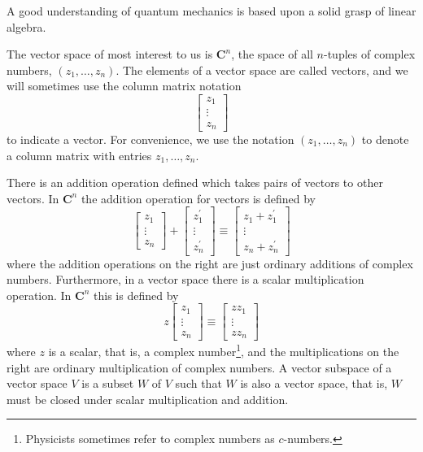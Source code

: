 A good understanding of quantum mechanics is based upon a solid grasp of linear algebra.

The vector space of most interest to us is $\mathbf{C}^{n}$, the space of all $n$-tuples of complex numbers, $\left(z_{1}, \ldots, z_{n}\right)$. The elements of a vector space are called vectors, and we will sometimes use the column matrix notation
\begin{equation}
    \left[\begin{array}{c}
z_{1} \\
\vdots \\
z_{n}
\end{array}\right]
\end{equation}
to indicate a vector. For convenience, we use the notation $\left(z_{1}, \ldots, z_{n}\right)$ to denote a column matrix with entries $z_{1}, \ldots, z_{n}$. 

There is an addition operation defined which takes pairs of vectors to other vectors. In $\mathbf{C}^{n}$ the addition operation for vectors is defined by
\begin{equation}
    \left[\begin{array}{c}
z_{1} \\
\vdots \\
z_{n}
\end{array}\right]+\left[\begin{array}{c}
z_{1}^{\prime} \\
\vdots \\
z_{n}^{\prime}
\end{array}\right] \equiv\left[\begin{array}{c}
z_{1}+z_{1}^{\prime} \\
\vdots \\
z_{n}+z_{n}^{\prime}
\end{array}\right]
\end{equation}
where the addition operations on the right are just ordinary additions of complex numbers. Furthermore, in a vector space there is a scalar multiplication operation. In $\mathbf{C}^{n}$ this is defined by
\begin{equation}
    z\left[\begin{array}{c}
z_{1} \\
\vdots \\
z_{n}
\end{array}\right] \equiv\left[\begin{array}{c}
z z_{1} \\
\vdots \\
z z_{n}
\end{array}\right]
\end{equation}
where $z$ is a scalar, that is, a complex number\footnote{Physicists sometimes refer to complex numbers as $c$-numbers.}, and the multiplications on the right are ordinary multiplication of complex numbers. A vector subspace of a vector space $V$ is a subset $W$ of $V$ such that $W$ is also a vector space, that is, $W$ must be closed under scalar multiplication and addition.

